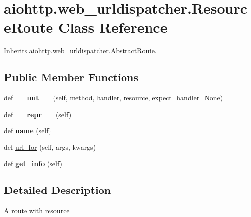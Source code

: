 \hypertarget{classaiohttp_1_1web__urldispatcher_1_1_resource_route}{}\section{aiohttp.\+web\+\_\+urldispatcher.\+Resource\+Route Class Reference}
\label{classaiohttp_1_1web__urldispatcher_1_1_resource_route}


Inherits \hyperlink{classaiohttp_1_1web__urldispatcher_1_1_abstract_route}{aiohttp.\+web\+\_\+urldispatcher.\+Abstract\+Route}.

\subsection*{Public Member Functions}
\begin{DoxyCompactItemize}
\item 
\mbox{\label{classaiohttp_1_1web__urldispatcher_1_1_resource_route_a806ff8d54921ffa6ec05b7e46d6771ed}} 
def {\bfseries \+\_\+\+\_\+init\+\_\+\+\_\+} (self, method, handler, resource, expect\+\_\+handler=None)
\item 
\mbox{\label{classaiohttp_1_1web__urldispatcher_1_1_resource_route_ac80c0fadd7b4eca204cbe4b8a007f5f9}} 
def {\bfseries \+\_\+\+\_\+repr\+\_\+\+\_\+} (self)
\item 
\mbox{\label{classaiohttp_1_1web__urldispatcher_1_1_resource_route_a969988e1315d17a847ccb35d5f7f0130}} 
def {\bfseries name} (self)
\item 
def \hyperlink{classaiohttp_1_1web__urldispatcher_1_1_resource_route_abca6ca26e2742f4c93c13cefd64d3453}{url\+\_\+for} (self, args, kwargs)
\item 
\mbox{\label{classaiohttp_1_1web__urldispatcher_1_1_resource_route_ac522672fa7ebe7c438a0aba6c13bd958}} 
def {\bfseries get\+\_\+info} (self)
\end{DoxyCompactItemize}


\subsection{Detailed Description}
\begin{DoxyVerb}A route with resource\end{DoxyVerb}
 

